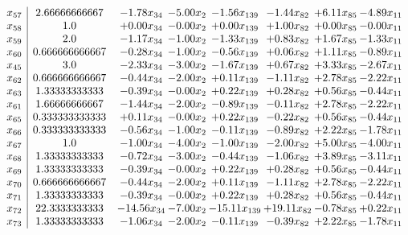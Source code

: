 \documentclass[8pt]{article}
\begin{document}
\[\begin{array}{c| c c@{\hskip 2pt} c@{\hskip 2pt} c@{\hskip 2pt} c@{\hskip 2pt} c@{\hskip 2pt} c@{\hskip 2pt} }
 x_{57}   &  2.66666666667 & -1.78 x_{34} & -5.00 x_{2} & -1.56 x_{139} & -1.44 x_{82} & +  6.11 x_{85} & -4.89 x_{11}\\
 x_{58}   &  1.0 & +  0.00 x_{34} & -0.00 x_{2} & +  0.00 x_{139} & +  1.00 x_{82} & +  0.00 x_{85} & -0.00 x_{11}\\
 x_{59}   &  2.0 & -1.17 x_{34} & -1.00 x_{2} & -1.33 x_{139} & +  0.83 x_{82} & +  1.67 x_{85} & -1.33 x_{11}\\
 x_{60}   &  0.666666666667 & -0.28 x_{34} & -1.00 x_{2} & -0.56 x_{139} & +  0.06 x_{82} & +  1.11 x_{85} & -0.89 x_{11}\\
 x_{45}   &  3.0 & -2.33 x_{34} & -3.00 x_{2} & -1.67 x_{139} & +  0.67 x_{82} & +  3.33 x_{85} & -2.67 x_{11}\\
 x_{62}   &  0.666666666667 & -0.44 x_{34} & -2.00 x_{2} & +  0.11 x_{139} & -1.11 x_{82} & +  2.78 x_{85} & -2.22 x_{11}\\
 x_{63}   &  1.33333333333 & -0.39 x_{34} & -0.00 x_{2} & +  0.22 x_{139} & +  0.28 x_{82} & +  0.56 x_{85} & -0.44 x_{11}\\
 x_{61}   &  1.66666666667 & -1.44 x_{34} & -2.00 x_{2} & -0.89 x_{139} & -0.11 x_{82} & +  2.78 x_{85} & -2.22 x_{11}\\
 x_{65}   &  0.333333333333 & +  0.11 x_{34} & -0.00 x_{2} & +  0.22 x_{139} & -0.22 x_{82} & +  0.56 x_{85} & -0.44 x_{11}\\
 x_{66}   &  0.333333333333 & -0.56 x_{34} & -1.00 x_{2} & -0.11 x_{139} & -0.89 x_{82} & +  2.22 x_{85} & -1.78 x_{11}\\
 x_{67}   &  1.0 & -1.00 x_{34} & -4.00 x_{2} & -1.00 x_{139} & -2.00 x_{82} & +  5.00 x_{85} & -4.00 x_{11}\\
 x_{68}   &  1.33333333333 & -0.72 x_{34} & -3.00 x_{2} & -0.44 x_{139} & -1.06 x_{82} & +  3.89 x_{85} & -3.11 x_{11}\\
 x_{69}   &  1.33333333333 & -0.39 x_{34} & -0.00 x_{2} & +  0.22 x_{139} & +  0.28 x_{82} & +  0.56 x_{85} & -0.44 x_{11}\\
 x_{70}   &  0.666666666667 & -0.44 x_{34} & -2.00 x_{2} & +  0.11 x_{139} & -1.11 x_{82} & +  2.78 x_{85} & -2.22 x_{11}\\
 x_{71}   &  1.33333333333 & -0.39 x_{34} & -0.00 x_{2} & +  0.22 x_{139} & +  0.28 x_{82} & +  0.56 x_{85} & -0.44 x_{11}\\
 x_{72}   &  22.3333333333 & -14.56 x_{34} & -7.00 x_{2} & -15.11 x_{139} & + 19.11 x_{82} & -0.78 x_{85} & +  0.22 x_{11}\\
 x_{73}   &  1.33333333333 & -1.06 x_{34} & -2.00 x_{2} & -0.11 x_{139} & -0.39 x_{82} & +  2.22 x_{85} & -1.78 x_{11}\\

\end{array}\]
\end{document}
